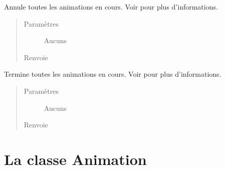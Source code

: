 \documentclass[letterpaper,10pt,french]{sphinxmanual}
\begin{document}
\begin{fulllineitems}
\label{\detokenize{funcs:pygame_animations.cancel_all}}
\sphinxAtStartPar
Annule toutes les animations en cours. Voir {\hyperref[\detokenize{animation:cancelmethod}]{}} pour plus d’informations.
\begin{quote}\begin{description}
\item[{Paramètres}] \leavevmode
\sphinxAtStartPar
Aucuns

\item[{Renvoie}] \leavevmode
\sphinxAtStartPar
{}

\end{description}\end{quote}

\end{fulllineitems}


\begin{fulllineitems}
\label{\detokenize{funcs:pygame_animations.fastforward_all}}
\sphinxAtStartPar
Termine toutes les animations en cours. Voir {\hyperref[\detokenize{animation:fastforwardmethod}]{}} pour plus d’informations.
\begin{quote}\begin{description}
\item[{Paramètres}] \leavevmode
\sphinxAtStartPar
Aucuns

\item[{Renvoie}] \leavevmode
\sphinxAtStartPar
{}

\end{description}\end{quote}

\end{fulllineitems}



\chapter{La classe Animation}
\label{\detokenize{animation:la-classe-animation}}\label{\detokenize{animation::doc}}
\end{document}

